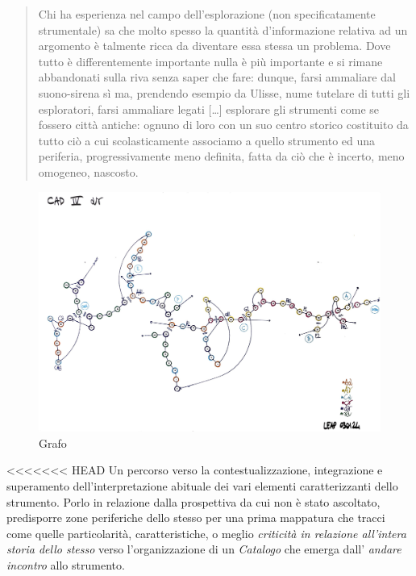 \documentclass{gs-adonis}
\begin{document}
\begin{quote}
  Chi ha esperienza nel campo dell’esplorazione (non specificatamente
  strumentale) sa che molto spesso la quantità d’informazione relativa ad un
  argomento è talmente ricca da diventare essa stessa un problema. Dove tutto è
  differentemente importante nulla è più importante e si rimane abbandonati
  sulla riva senza saper che fare: dunque, farsi ammaliare dal suono-sirena sì
  ma, prendendo esempio da Ulisse, nume tutelare di tutti gli esploratori,
  farsi ammaliare legati [\ldots] esplorare gli strumenti come se fossero città
  antiche: ognuno di loro con un suo centro storico costituito da tutto ciò a
  cui scolasticamente associamo a quello strumento ed una periferia,
  progressivamente meno definita, fatta da ciò che è incerto, meno omogeneo,
  nascosto. \cite{netti23}
\end{quote}

\begin{figure}[t]
  \centering
  \includegraphics[width=\linewidth]{images/CAD-IV-GRAFO-ANNOTATO.pdf}
  \captionsetup{width=.81\linewidth}
  \caption{Grafo}
  \label{grafo}
\end{figure}

<<<<<<< HEAD
Un percorso verso la contestualizzazione, integrazione e superamento
dell’interpretazione abituale dei vari elementi caratterizzanti dello strumento.
Porlo in relazione dalla prospettiva da cui non è stato ascoltato, predisporre
zone periferiche dello stesso per una prima mappatura che tracci come
quelle particolarità, caratteristiche, o meglio \emph{criticità in relazione
all'intera storia dello stesso} verso l'organizzazione di un \emph{Catalogo} che
emerga dall' \emph{andare incontro} allo strumento.
\end{document}
